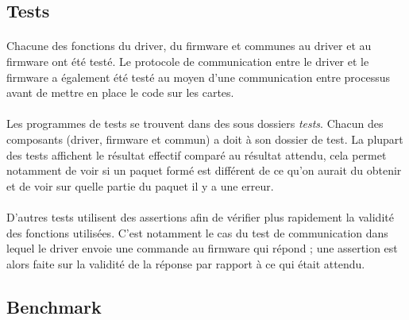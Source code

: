 \subsection{Tests}
\paragraph{}
Chacune des fonctions du driver, du firmware et communes au driver et au
firmware ont été testé. Le protocole de communication entre le driver et le
firmware a également été testé au moyen d'une communication entre processus
avant de mettre en place le code sur les cartes.
\paragraph{}
Les programmes de tests se trouvent dans des sous dossiers \emph{tests}.
Chacun des composants (driver, firmware et commun) a doit à son dossier de
test. La plupart des tests affichent le résultat effectif comparé au résultat
attendu, cela permet notamment de voir si un paquet formé est différent de ce
qu'on aurait du obtenir et de voir sur quelle partie du paquet il y a une
erreur.
\paragraph{}
D'autres tests utilisent des assertions afin de vérifier plus rapidement la
validité des fonctions utilisées. C'est notamment le cas du test de
communication dans lequel le driver envoie une commande au firmware qui
répond ; une assertion est alors faite sur la validité de la réponse par
rapport à ce qui était attendu.

\subsection{Benchmark}

